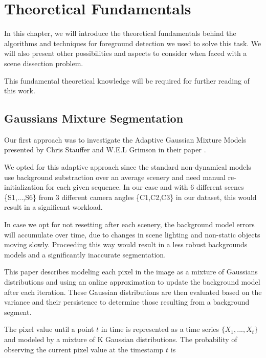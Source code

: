 \section{Theoretical Fundamentals}


In this chapter, we will introduce the theoretical fundamentals behind the algorithms and techniques for foreground detection we used to solve this task. We will also present other possibilities and aspects to consider when faced with a scene dissection problem. 

This fundamental theoretical knowledge will be required for further reading of this work.

\subsection{Gaussians Mixture Segmentation}

Our first approach was to investigate the Adaptive Gaussian Mixture Models presented by Chris Stauffer and W.E.L Grimson in their paper \linebreak \cite{Adaptive background mixture models for real-time tracking}.

\medskip

We opted for this adaptive approach since the standard non-dynamical models use background substraction over an average scenery and need manual re-initialization for each given sequence. In our case and with 6 different scenes \{S1,...,S6\} from 3 different camera angles \{C1,C2,C3\} in our dataset, this would result in a significant workload.

\medskip

In case we opt for not resetting after each scenery, the background model errors will accumulate over time, due to changes in scene lighting and non-static objects moving slowly. Proceeding this way would result in a less robust backgrounds models and a significantly inaccurate segmentation.

\medskip

This paper describes modeling each pixel in the image as a mixture of Gaussians distributions and using an online approximation to update the background model after each iteration. These Gaussian distributions are then evaluated based on the variance and their persistence to determine those resulting from a background segment.

\medskip

The pixel value until a point $t$ in time is represented as a time series $\{X_{1}, ..., X_{t}\}$ and modeled by a mixture of K Gaussian distributions. The probability of observing the current pixel value at the timestamp $t$ is

